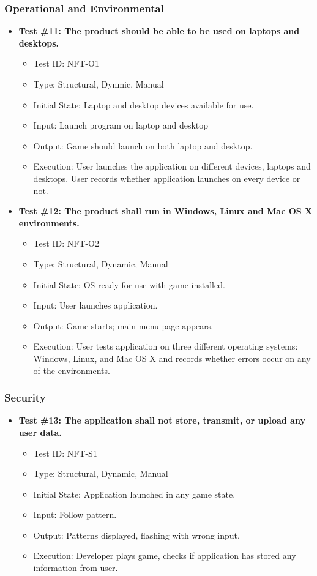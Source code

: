\documentclass[12pt, titlepage]{article}
\begin{document}
\subsubsection{Operational and Environmental}
\begin{itemize}
\item \textbf{Test \#11: The product should be able to be used on laptops and desktops.}
\begin{itemize}
\item Test ID: NFT-O1
\item Type: Structural, Dynmic, Manual				
\item Initial State: Laptop and desktop devices available for use.		
\item Input: Launch program on laptop and desktop
\item Output: Game should launch on both laptop and desktop.		
\item Execution: User launches the application on different devices, laptops and desktops. User records whether application launches on every device or not.
\end{itemize}

\item \textbf{Test \#12: The product shall run in Windows, Linux and Mac OS X environments.}
\begin{itemize}
\item Test ID: NFT-O2
\item Type: Structural, Dynamic, Manual			
\item Initial State: OS ready for use with game installed.		
\item Input: User launches application.			
\item Output: Game starts; main menu page appears.				
\item Execution: User tests application on three different operating systems: Windows, Linux, and Mac OS X and records whether errors occur on any of the environments.
\end{itemize}
\end{itemize}

\subsubsection{Security}
\begin{itemize}
\item \textbf{Test \#13: The application shall not store, transmit, or upload any user data.}
\begin{itemize}
\item Test ID: NFT-S1
\item Type: Structural, Dynamic, Manual				
\item Initial State: Application launched in any game state.		
\item Input: Follow pattern.
\item Output: Patterns displayed, flashing with wrong input.		
\item Execution: Developer plays game, checks if application has stored any information from user.
\end{itemize}
\end{itemize}
\end{document}

